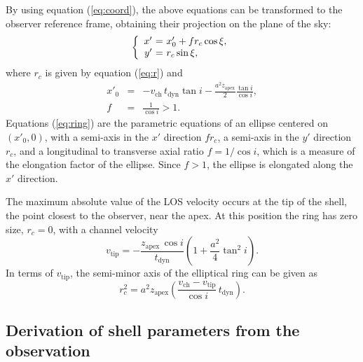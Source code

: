 \documentclass[12pt]{mythesis}
\begin{document}
By using equation (\ref{eq:coord}), the above equations can be transformed to the observer reference frame, obtaining their projection on the plane of the sky:
\begin{equation}\label{eq:ring}
\left\{\begin{array}{r@{\ }c@{\ }l}
x' &=& x'_0+f r_c\cos\xi,\\
y' &=& r_c\sin \xi,       
\end{array}\right.
\end{equation}
where $r_c$ is given by equation (\ref{eq:r}) and
\begin{eqnarray}\label{eq:x'0}
	x'_0 &=& -v_\mathrm{ch}\,t_\mathrm{dyn} \tan i-\frac{a^2 z_\mathrm{apex}}{2}\frac{\tan i}{\cos i}, \\
	f &=& \frac{1}{\cos i}>1.
\end{eqnarray}
Equations (\ref{eq:ring}) are the parametric equations of an ellipse centered on $(x'_0, 0)$, with
a semi-axis in the $x'$ direction $f r_c$,
a semi-axis in the $y'$ direction $r_c$,
and a longitudinal to transverse axial ratio $f=1/\cos i$, which is a measure of the elongation factor of the ellipse.
Since $f>1$, the ellipse is elongated along the $x'$ direction.

The maximum absolute value of the LOS velocity occurs at the tip of the shell, the point closest to the observer, near the apex. 
At this position the ring has zero size, $r_c= 0$, with a channel velocity 
\begin{equation}\label{eq:z0}
	v_\mathrm{tip}= -\frac{z_\mathrm{apex}\,\cos i}{t_\mathrm{dyn}}\left(1+\frac{a^2}{4}\tan^2 i\right).
\end{equation}
In terms of $v_\mathrm{tip}$, the semi-minor axis of the elliptical ring can be given as
\begin{equation}\label{eq:ry'}
	r_c^2= a^2 z_\mathrm{apex}\left(\frac{v_\mathrm{ch}-v_\mathrm{tip}}{\cos i}\,t_\mathrm{dyn}\right).
\end{equation}


\subsection{Derivation of shell parameters from the observation}
\end{document}
